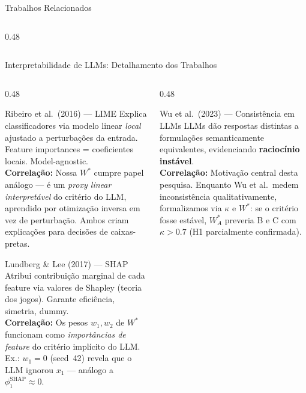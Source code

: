 \documentclass[aspectratio=169, 8pt]{beamer}
\begin{document}
\begin{frame}{Trabalhos Relacionados}
\begin{columns}[T]
\begin{column}{0.48\textwidth}
    \end{column}
  \end{columns}
\end{frame}

\begin{frame}{Interpretabilidade de LLMs: Detalhamento dos Trabalhos}
  \begin{columns}[T]
    \begin{column}{0.48\textwidth}
      \begin{block}{\footnotesize Ribeiro et al.\ (2016) --- LIME}
        \scriptsize
        Explica classificadores via modelo linear \emph{local} ajustado a
        perturbações da entrada. Feature importances = coeficientes locais.
        Model-agnostic.\\[2pt]
        \textcolor{myblue}{\textbf{Correlação:}} Nossa $W^*$ cumpre papel
        análogo --- é um \emph{proxy linear interpretável} do critério do
        LLM, aprendido por otimização inversa em vez de perturbação.
        Ambos criam explicações para decisões de caixas-pretas.
      \end{block}
      \vspace{0.2em}
      \begin{block}{\footnotesize Lundberg \& Lee (2017) --- SHAP}
        \scriptsize
        Atribui contribuição marginal de cada feature via valores de
        Shapley (teoria dos jogos). Garante eficiência, simetria, dummy.\\[2pt]
        \textcolor{myblue}{\textbf{Correlação:}} Os pesos $w_1, w_2$ de
        $W^*$ funcionam como \emph{importâncias de feature} do critério
        implícito do LLM. Ex.: $w_1{=}0$ (seed~42) revela que o LLM
        ignorou $x_1$ --- análogo a $\phi_1^{\text{SHAP}} \approx 0$.
      \end{block}
    \end{column}
    \begin{column}{0.48\textwidth}
      \begin{block}{\footnotesize Wu et al.\ (2023) --- Consistência em LLMs}
        \scriptsize
        LLMs dão respostas distintas a formulações semanticamente
        equivalentes, evidenciando \textbf{raciocínio instável}.\\[2pt]
        \textcolor{myblue}{\textbf{Correlação:}} Motivação central desta
        pesquisa. Enquanto Wu et al.\ medem inconsistência
        qualitativamente, formalizamos via $\kappa$ e $W^*$: se o
        critério fosse estável, $W^*_A$ preveria B e C com
        $\kappa{>}0.7$ (H1 parcialmente confirmada).

\end{block}
\end{column}
\end{columns}
\end{frame}
\end{document}
